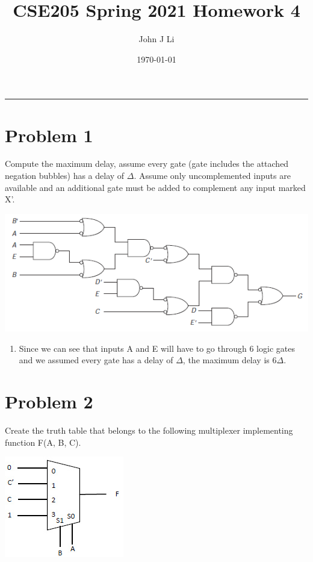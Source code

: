 \documentclass{article}
\title{CSE205 Spring 2021 Homework 4}
\date{\today}
\author{John J Li}
\begin{document}
    \maketitle
    \thispagestyle{empty}
    \noindent\rule{\textwidth}{0.8pt}


    \section*{Problem 1}

    Compute the maximum delay, assume every gate (gate includes the attached negation bubbles) 
    has a delay of $\Delta$. Assume only uncomplemented inputs are available and an additional gate 
    must be added to complement any input marked X’.

    \begin{center}
        \includegraphics[width=\linewidth]{Problem_1.png}
    \end{center}

    \begin{enumerate}[label={\bfseries Solution:}, leftmargin=*]
        \item Since we can see that inputs A and E will have to 
        go through 6 logic gates and we assumed every gate has a delay of $\Delta$, the maximum delay is $6\Delta$. 
    \end{enumerate}


    \section*{Problem 2}

    Create the truth table that belongs to the following multiplexer implementing function 
    F(A, B, C).

    \begin{center}
        \includegraphics[scale=0.75]{Problem_2.jpg}
    \end{center}
\end{document}
